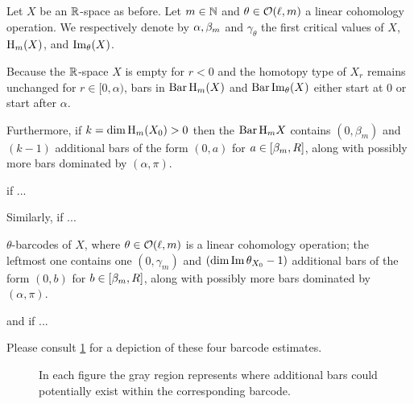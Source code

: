 \subsubsection{}\label{subsub:barcode_general}

Let $X$ be an $\mathbb{R}$-space as before.
Let \(m \in \mathbb{N}\) and \(\theta \in \mathcal{O}(\ell,m)\) a linear cohomology operation.
We respectively denote by $\alpha, \beta_m$ and $\gamma_\theta$ the first critical values of $X$, \(\mathrm{H}_m(X)\), and \(\operatorname{Im}_\theta(X)\).

Because the $\mathbb{R}$-space $X$ is empty for \(r < 0\) and the homotopy type of $X_r$ remains unchanged for $r \in [0, \alpha)$, bars in \(\operatorname{Bar} \mathrm{H}_m(X)\) and $\operatorname{Bar}\operatorname{Im}_\theta(X)$ either start at $0$ or start after $\alpha$.

Furthermore, if \(k = \dim \operatorname{H}_m(X_0) > 0\) then the $\operatorname{Bar}\mathrm{H}_m X$ contains $(0,\beta_m)$ and \((k - 1)\) additional bars of the form \((0, a)\) for \(a \in [\beta_m, R]\), along with possibly more bars dominated by \((\alpha, \pi)\).

if ...

Similarly, if ...

$\theta$-barcodes of $X$, where $\theta\in\mathcal{O}(\ell,m)$ is a linear cohomology operation; the leftmost one contains one \((0, \gamma_m)\) and \((\dim \operatorname{Im} \theta_{X_0} - 1)\) additional bars of the form \((0, b)\) for \(b \in [\beta_m, R]\), along with possibly more bars dominated by \((\alpha, \pi)\).

and if ...

Please consult \cref{fig:barcodes_general} for a depiction of these four barcode estimates.

\begin{figure}
	\centering
	
	\caption{In each figure the gray region represents where additional bars could potentially exist within the corresponding barcode.}
	\label{fig:barcodes_general}
\end{figure}